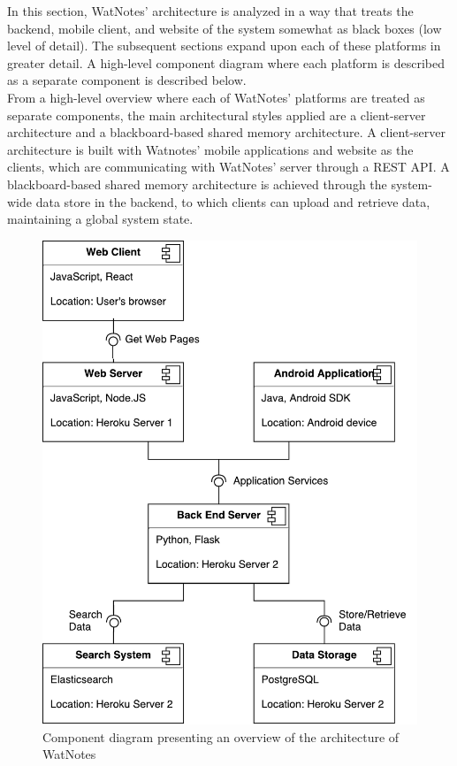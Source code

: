 \documentclass[12pt]{article}
\begin{document}
    In this section, WatNotes' architecture is analyzed in a way that treats the backend, mobile client, and website of the system
    somewhat as black boxes (low level of detail). The subsequent sections expand upon each of these platforms in greater detail. A high-level component diagram where each platform is described as a separate component is described below. \\

    From a high-level overview where each of WatNotes' platforms are treated as separate components, the main architectural styles applied are
    a client-server architecture and a blackboard-based shared memory architecture. A client-server architecture is built with Watnotes' mobile
    applications and website as the clients, which are communicating with WatNotes' server through a REST API. A blackboard-based shared memory
    architecture is achieved through the system-wide data store in the backend, to which clients can upload and retrieve data, maintaining a
    global system state. \\

    \begin{figure}[H]
      \includegraphics[width=\textwidth]{assets/overview.pdf}
      \caption{Component diagram presenting an overview of the architecture of WatNotes}
    \end{figure}
\end{document}
